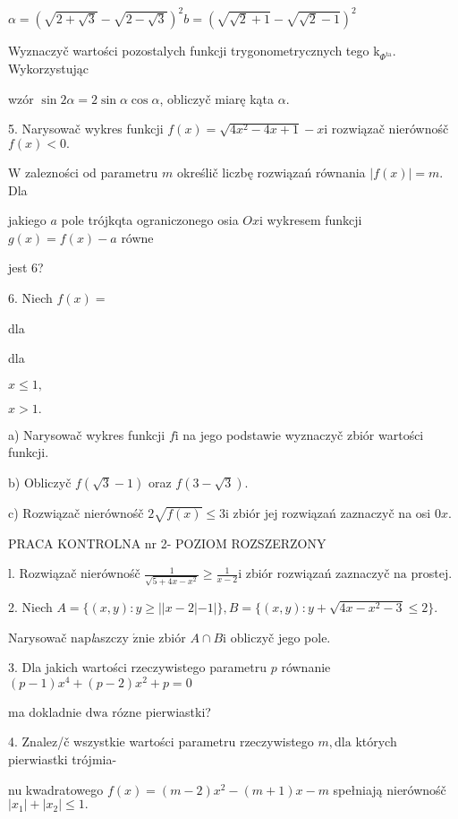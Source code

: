 \documentclass[a4paper,12pt]{article}
\begin{document}
$\alpha=(\sqrt{2+\sqrt{3}}-\sqrt{2-\sqrt{3}})^{2}b=(\sqrt{\sqrt{2}+1}-\sqrt{\sqrt{2}-1})^{2}$

Wyznaczyč wartości pozostalych funkcji trygonometrycznych tego $\mathrm{k}_{\Phi^{\mathrm{t}\mathrm{a}}}$. Wykorzystując

wzór $\sin 2\alpha=2\sin\alpha\cos\alpha$, obliczyč miarę kąta $\alpha.$

5. Narysowač wykres funkcji $f(x)=\sqrt{4x^{2}-4x+1}-x \mathrm{i}$ rozwiązač nierównośč $f(x)<0.$

$\mathrm{W}$ zalezności od parametru $m$ określič liczbę rozwiązań równania $|f(x)| = m$. Dla

jakiego $a$ pole trójkqta ograniczonego osia $Ox\mathrm{i}$ wykresem funkcji $g(x)=f(x)-a$ równe

jest 6?

6. Niech $f(x)=$

dla

dla

$x\leq 1,$

$x>1.$

a) Narysowač wykres funkcji $f\mathrm{i}$ na jego podstawie wyznaczyč zbiór wartości funkcji.

b) Obliczyč $f(\sqrt{3}-1)$ oraz $f(3-\sqrt{3}).$

c) Rozwiązač nierównośč $2\sqrt{f(x)}\leq 3\mathrm{i}$ zbiór jej rozwiązań zaznaczyč na osi $0x.$





PRACA KONTROLNA nr 2- POZIOM ROZSZERZONY

l. Rozwiązač nierównośč $\displaystyle \frac{1}{\sqrt{5+4x-x^{2}}}\geq\frac{1}{x-2} \mathrm{i}$ zbiór rozwiązań zaznaczyč $\mathrm{n}\mathrm{a}$ prostej.

2. Niech $A=\{(x,y):y\geq||x-2|-1|\}, B=\{(x,y):y+\sqrt{4x-x^{2}-3}\leq 2\}.$

Narysowač $\mathrm{n}\mathrm{a}\mathrm{p}${\it l}aszczy $\acute{\mathrm{z}}\mathrm{n}\mathrm{i}\mathrm{e}$ zbiór $A\cap B\mathrm{i}$ obliczyč jego pole.

3. Dla jakich wartości rzeczywistego parametru $p$ równanie $(p-1)x^{4}+(p-2)x^{2}+p=0$

ma dokladnie $\mathrm{d}\mathrm{w}\mathrm{a}$ rózne pierwiastki?

4. Znalez/č wszystkie wartości parametru rzeczywistego $m, \mathrm{d}\mathrm{l}\mathrm{a}$ których pierwiastki trójmia-

nu kwadratowego $f(x)=(m-2)x^{2}-(m+1)x-m$ spełniają nierównośč $|x_{1}|+|x_{2}|\leq 1.$
\end{document}

